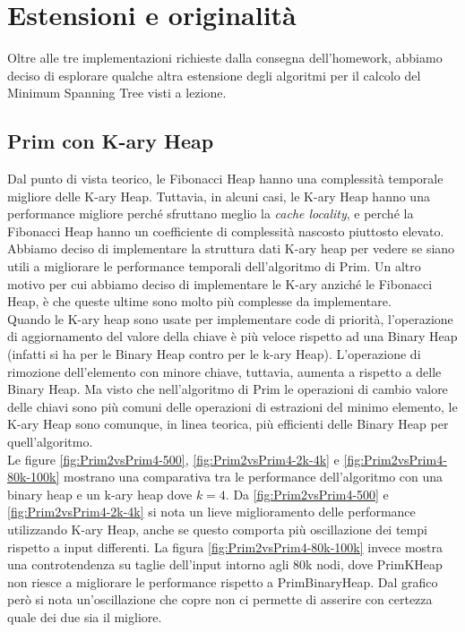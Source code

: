 \section{Estensioni e originalità}
\label{cap:extensions-and-originalities}

Oltre alle tre implementazioni richieste dalla consegna dell'homework, abbiamo deciso di esplorare qualche altra estensione degli algoritmi per il calcolo del Minimum Spanning Tree visti a lezione.

\subsection{Prim con K-ary Heap}

Dal punto di vista teorico, le Fibonacci Heap hanno una complessità temporale migliore delle K-ary Heap.
Tuttavia, in alcuni casi, le K-ary Heap hanno una performance migliore perché sfruttano meglio la \textit{cache locality}, e perché la Fibonacci Heap hanno un coefficiente di complessità nascosto piuttosto elevato. Abbiamo deciso di implementare la struttura dati K-ary heap per vedere se siano utili a migliorare le performance temporali dell'algoritmo di Prim.
Un altro motivo per cui abbiamo deciso di implementare le K-ary anziché le Fibonacci Heap, è che queste ultime sono molto più complesse da implementare. \\

\noindent Quando le K-ary heap sono usate per implementare code di priorità, l'operazione di aggiornamento del valore della chiave è più veloce rispetto ad una Binary Heap (infatti si ha \complexityLogN{} per le Binary Heap contro \complexityLogkN{} per le k-ary Heap).
L'operazione di rimozione dell'elemento con minore chiave, tuttavia, aumenta a \complexityKLogkN{} rispetto a \complexityLogN{} delle Binary Heap. Ma visto che nell'algoritmo di Prim le operazioni di cambio valore delle chiavi sono più comuni delle operazioni di estrazioni del minimo elemento, le K-ary Heap sono comunque, in linea teorica, più efficienti delle Binary Heap per quell'algoritmo. \\

\noindent Le figure \ref{fig:Prim2vsPrim4-500}, \ref{fig:Prim2vsPrim4-2k-4k}
e \ref{fig:Prim2vsPrim4-80k-100k} mostrano una comparativa tra le performance
dell'algoritmo con una binary heap e un k-ary heap dove $k = 4$.
Da \ref{fig:Prim2vsPrim4-500} e \ref{fig:Prim2vsPrim4-2k-4k} si nota
un lieve miglioramento delle performance utilizzando K-ary Heap,
anche se questo comporta più oscillazione dei tempi rispetto a input
differenti. La figura \ref{fig:Prim2vsPrim4-80k-100k} invece mostra
una controtendenza su taglie dell'input intorno agli 80k nodi, dove
PrimKHeap non riesce a migliorare le performance rispetto a 
PrimBinaryHeap. Dal grafico però si nota un'oscillazione che copre
non ci permette di asserire con certezza quale dei due sia il migliore.

